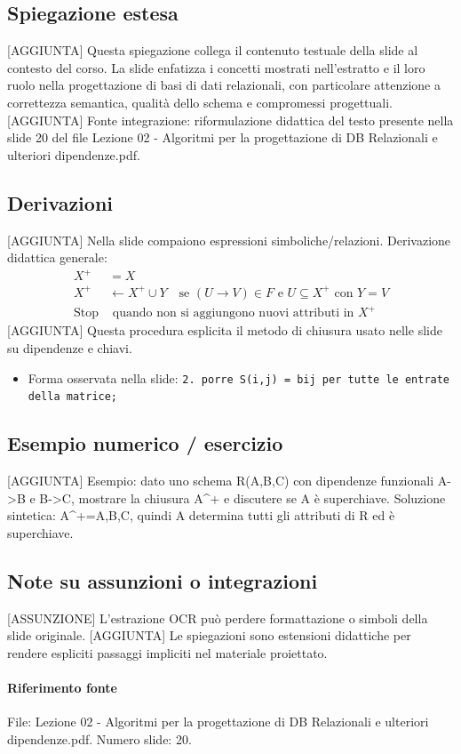 \documentclass[11pt]{article}
\begin{document}
\subsection*{Spiegazione estesa}
[AGGIUNTA] Questa spiegazione collega il contenuto testuale della slide al contesto del corso. La slide enfatizza i concetti mostrati nell'estratto e il loro ruolo nella progettazione di basi di dati relazionali, con particolare attenzione a correttezza semantica, qualità dello schema e compromessi progettuali.
[AGGIUNTA] Fonte integrazione: riformulazione didattica del testo presente nella slide 20 del file Lezione 02 - Algoritmi per la progettazione di DB Relazionali e ulteriori dipendenze.pdf.
\subsection*{Derivazioni}
[AGGIUNTA] Nella slide compaiono espressioni simboliche/relazioni. Derivazione didattica generale:
\begin{align*}
X^+ &= X \\
X^+ &\leftarrow X^+ \cup Y \quad \text{se } (U \to V) \in F \text{ e } U \subseteq X^+ \text{ con } Y=V \\
\text{Stop} &\text{ quando non si aggiungono nuovi attributi in } X^+
\end{align*}
[AGGIUNTA] Questa procedura esplicita il metodo di chiusura usato nelle slide su dipendenze e chiavi.
\begin{itemize}[leftmargin=*]
\item Forma osservata nella slide: \texttt{2.   porre S(i,j) = bij per tutte le entrate della matrice;}
\end{itemize}
\subsection*{Esempio numerico / esercizio}
[AGGIUNTA] Esempio: dato uno schema R(A,B,C) con dipendenze funzionali A->B e B->C, mostrare la chiusura A^+ e discutere se A è superchiave. Soluzione sintetica: A^+={A,B,C}, quindi A determina tutti gli attributi di R ed è superchiave.
\subsection*{Note su assunzioni o integrazioni}
[ASSUNZIONE] L'estrazione OCR può perdere formattazione o simboli della slide originale.
[AGGIUNTA] Le spiegazioni sono estensioni didattiche per rendere espliciti passaggi impliciti nel materiale proiettato.
\paragraph{Riferimento fonte} File: Lezione 02 - Algoritmi per la progettazione di DB Relazionali e ulteriori dipendenze.pdf. Numero slide: 20.
\end{document}
